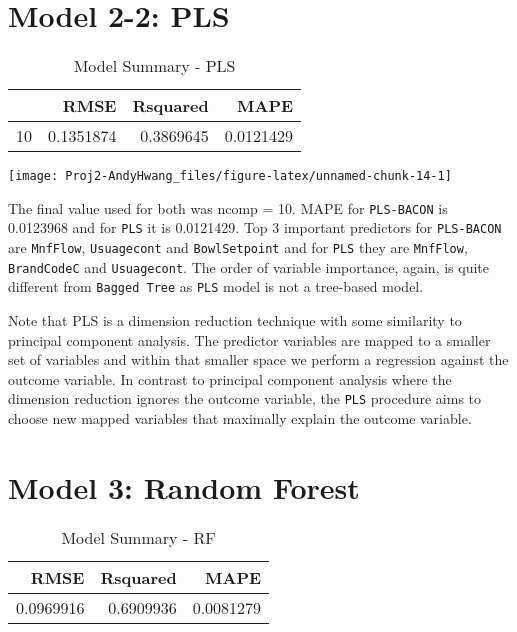 \documentclass[]{report}
\begin{document}
\section{Model 2-2: PLS}\label{model-2-2-pls}

\begin{table}[H]

\caption{\label{tab:unnamed-chunk-14}Model Summary - PLS}
\centering
\fontsize{8}{10}\selectfont
\begin{tabular}[t]{lrrr}
\toprule
\textbf{ } & \textbf{RMSE} & \textbf{Rsquared} & \textbf{MAPE}\\
\midrule
\rowcolor{gray!6}  10 & 0.1351874 & 0.3869645 & 0.0121429\\
\bottomrule
\end{tabular}
\end{table}

\begin{center}\texttt{[image: Proj2-AndyHwang\_files/figure-latex/unnamed-chunk-14-1]} \end{center}

The final value used for both was ncomp = 10. MAPE for
\texttt{PLS-BACON} is 0.0123968 and for \texttt{PLS} it is 0.0121429.
Top 3 important predictors for \texttt{PLS-BACON} are \texttt{MnfFlow},
\texttt{Usuagecont} and \texttt{BowlSetpoint} and for \texttt{PLS} they
are \texttt{MnfFlow}, \texttt{BrandCodeC} and \texttt{Usuagecont}. The
order of variable importance, again, is quite different from
\texttt{Bagged\ Tree} as \texttt{PLS} model is not a tree-based model.

Note that PLS is a dimension reduction technique with some similarity to
principal component analysis. The predictor variables are mapped to a
smaller set of variables and within that smaller space we perform a
regression against the outcome variable. In contrast to principal
component analysis where the dimension reduction ignores the outcome
variable, the \texttt{PLS} procedure aims to choose new mapped variables
that maximally explain the outcome variable.

\section{Model 3: Random Forest}\label{model-3-random-forest}

\begin{table}[H]

\caption{\label{tab:unnamed-chunk-16}Model Summary - RF}
\centering
\fontsize{8}{10}\selectfont
\begin{tabular}[t]{rrr}
\toprule
\textbf{RMSE} & \textbf{Rsquared} & \textbf{MAPE}\\
\midrule
\rowcolor{gray!6}  0.0969916 & 0.6909936 & 0.0081279\\
\bottomrule
\end{tabular}
\end{table}
\end{document}
